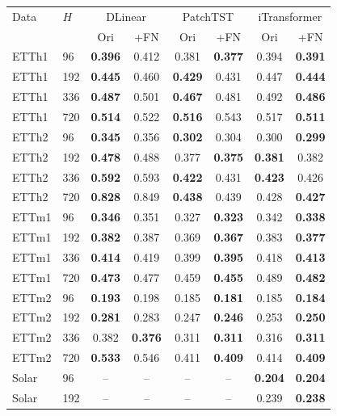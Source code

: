 \begin{tabular}{llcccccc}
\toprule
Data & $H$ & \multicolumn{2}{c}{DLinear} & \multicolumn{2}{c}{PatchTST} & \multicolumn{2}{c}{iTransformer} \\
 & & Ori & +FN & Ori & +FN & Ori & +FN \\
\midrule
ETTh1 & 96 & \textbf{0.396} & 0.412 & 0.381 & \textbf{0.377} & 0.394 & \textbf{0.391} \\
ETTh1 & 192 & \textbf{0.445} & 0.460 & \textbf{0.429} & 0.431 & 0.447 & \textbf{0.444} \\
ETTh1 & 336 & \textbf{0.487} & 0.501 & \textbf{0.467} & 0.481 & 0.492 & \textbf{0.486} \\
ETTh1 & 720 & \textbf{0.514} & 0.522 & \textbf{0.516} & 0.543 & 0.517 & \textbf{0.511} \\
ETTh2 & 96 & \textbf{0.345} & 0.356 & \textbf{0.302} & 0.304 & 0.300 & \textbf{0.299} \\
ETTh2 & 192 & \textbf{0.478} & 0.488 & 0.377 & \textbf{0.375} & \textbf{0.381} & 0.382 \\
ETTh2 & 336 & \textbf{0.592} & 0.593 & \textbf{0.422} & 0.431 & \textbf{0.423} & 0.426 \\
ETTh2 & 720 & \textbf{0.828} & 0.849 & \textbf{0.438} & 0.439 & 0.428 & \textbf{0.427} \\
ETTm1 & 96 & \textbf{0.346} & 0.351 & 0.327 & \textbf{0.323} & 0.342 & \textbf{0.338} \\
ETTm1 & 192 & \textbf{0.382} & 0.387 & 0.369 & \textbf{0.367} & 0.383 & \textbf{0.377} \\
ETTm1 & 336 & \textbf{0.414} & 0.419 & 0.399 & \textbf{0.395} & 0.418 & \textbf{0.413} \\
ETTm1 & 720 & \textbf{0.473} & 0.477 & 0.459 & \textbf{0.455} & 0.489 & \textbf{0.482} \\
ETTm2 & 96 & \textbf{0.193} & 0.198 & 0.185 & \textbf{0.181} & 0.185 & \textbf{0.184} \\
ETTm2 & 192 & \textbf{0.281} & 0.283 & 0.247 & \textbf{0.246} & 0.253 & \textbf{0.250} \\
ETTm2 & 336 & 0.382 & \textbf{0.376} & 0.311 & \textbf{0.311} & 0.316 & \textbf{0.311} \\
ETTm2 & 720 & \textbf{0.533} & 0.546 & 0.411 & \textbf{0.409} & 0.414 & \textbf{0.409} \\
Solar & 96 & -- & -- & -- & -- & \textbf{0.204} & \textbf{0.204} \\
Solar & 192 & -- & -- & -- & -- & 0.239 & \textbf{0.238} \\

\end{tabular}
